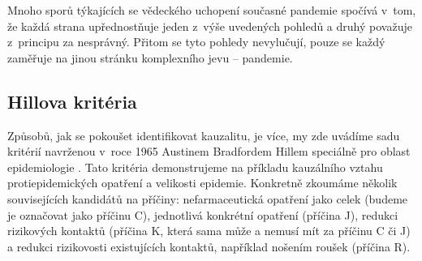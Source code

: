 Mnoho sporů týkajících se vědeckého uchopení současné pandemie spočívá v~tom, že každá strana upřednostňuje jeden z~výše uvedených pohledů a druhý považuje z~principu za nesprávný. Přitom se tyto pohledy nevylučují, pouze se každý zaměřuje na jinou stránku komplexního jevu -- pandemie. 


\subsection*{Hillova kritéria}

Způsobů, jak se pokoušet identifikovat kauzalitu, je více,
my zde uvádíme sadu kritérií navrženou v~roce 1965 Austinem Bradfordem Hillem
speciálně pro oblast epidemiologie \cite{hill1965environment}. Tato kritéria demonstrujeme na příkladu kauzálního vztahu protiepidemických opatření a velikosti epidemie. Konkretně zkoumáme několik souvisejících kandidátů na příčiny: nefarmaceutická opatření jako celek (budeme je označovat jako příčinu C),
jednotlivá konkrétní opatření (příčina J), redukci rizikových
kontaktů (příčina K, která sama může a nemusí mít za příčinu C či
J) a redukci rizikovosti existujících kontaktů, například nošením roušek (příčina
R). 

\newpage

